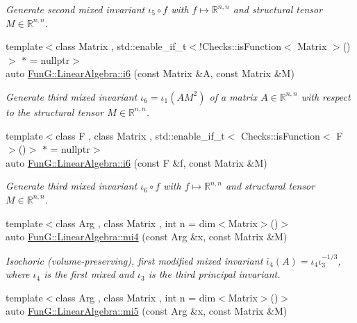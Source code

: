 \begin{DoxyCompactItemize}
\begin{DoxyCompactList}\small\item\em \-Generate second mixed invariant $ \iota_5\circ f $ with $f\mapsto\mathbb{R}^{n,n}$ and structural tensor $M\in\mathbb{R}^{n,n}$. \end{DoxyCompactList}\item 
{\footnotesize template$<$class Matrix , std\-::enable\-\_\-if\-\_\-t$<$!\-Checks\-::is\-Function$<$ Matrix $>$()$>$ $\ast$  = nullptr$>$ }\\auto \hyperlink{group__InvariantGroup_gad9f0627946667bb052212f65ecdd002b}{\-Fun\-G\-::\-Linear\-Algebra\-::i6} (const \-Matrix \&\-A, const \-Matrix \&\-M)
\begin{DoxyCompactList}\small\item\em \-Generate third mixed invariant $ \iota_6=\iota_1(AM^2) $ of a matrix $A\in\mathbb{R}^{n,n}$ with respect to the structural tensor $M\in\mathbb{R}^{n,n}$. \end{DoxyCompactList}\item 
{\footnotesize template$<$class F , class Matrix , std\-::enable\-\_\-if\-\_\-t$<$ Checks\-::is\-Function$<$ F $>$()$>$ $\ast$  = nullptr$>$ }\\auto \hyperlink{group__InvariantGroup_ga2536c80df733bb3e089487202c3688c1}{\-Fun\-G\-::\-Linear\-Algebra\-::i6} (const \-F \&f, const \-Matrix \&\-M)
\begin{DoxyCompactList}\small\item\em \-Generate third mixed invariant $ \iota_6\circ f $ with $f\mapsto\mathbb{R}^{n,n}$ and structural tensor $M\in\mathbb{R}^{n,n}$. \end{DoxyCompactList}\item 
{\footnotesize template$<$class Arg , class Matrix , int n = dim$<$\-Matrix$>$()$>$ }\\auto \hyperlink{group__InvariantGroup_ga7ee54c5d056877bdefefb8e54ad17791}{\-Fun\-G\-::\-Linear\-Algebra\-::mi4} (const \-Arg \&x, const \-Matrix \&\-M)
\begin{DoxyCompactList}\small\item\em \-Isochoric (volume-\/preserving), first modified mixed invariant $ \bar\iota_4(A)=\iota_4\iota_3^{-1/3} $, where $\iota_4$ is the first mixed and $\iota_3$ is the third principal invariant. \end{DoxyCompactList}\item 
{\footnotesize template$<$class Arg , class Matrix , int n = dim$<$\-Matrix$>$()$>$ }\\auto \hyperlink{group__InvariantGroup_ga189bc682b34d13902da335c5eb502faa}{\-Fun\-G\-::\-Linear\-Algebra\-::mi5} (const \-Arg \&x, const \-Matrix \&\-M)

\end{DoxyCompactItemize}
